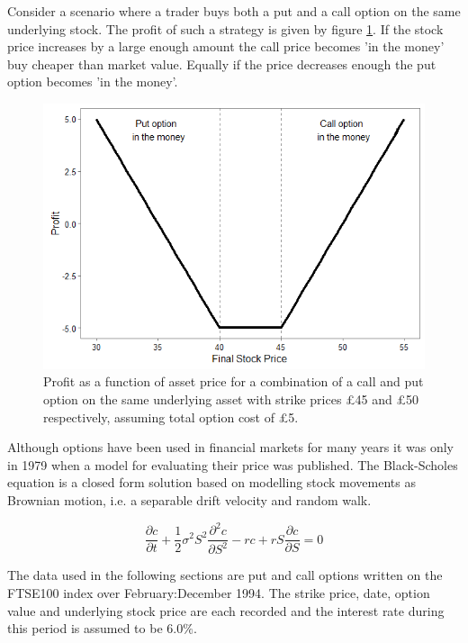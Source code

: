 \documentclass{sig-alternate-05-2015}
\begin{document}
Consider a scenario where a trader buys both a put and a call option on the same underlying stock. The profit of such a strategy is given by figure \ref{fig:Q1plot}. If the stock price increases by a large enough amount the call price becomes 'in the money' buy cheaper than market value. Equally if the price decreases enough the put option becomes 'in the money'. 

\begin{figure}
	\includegraphics[width=\linewidth]{Q1plot.png}
	\centering
	\caption{Profit as a function of asset price for a combination of a call and put option on the same underlying asset with strike prices £45 and £50 respectively, assuming total option cost of £5.}
			\label{fig:Q1plot}
\end{figure} 

Although options have been used in financial markets for many years it was only in 1979 when a model for evaluating their price was published\cite{blackscholes}. The Black-Scholes equation is a closed form solution based on modelling stock movements as Brownian motion, i.e. a separable drift velocity and random walk. 

\begin{equation}
\frac{\partial c}{\partial t} + \frac{1}{2}\sigma^2S^2\frac{\partial^2c}{\partial S^2} - rc + rS\frac{\partial c}{\partial S} = 0
\label{eq:blackscholes}
\end{equation}

The data used in the following sections are put and call options written on the FTSE100 index over February:December 1994. The strike price, date, option value and underlying stock price are each recorded and the interest rate during this period is assumed to be $6.0\%$.
\end{document}
